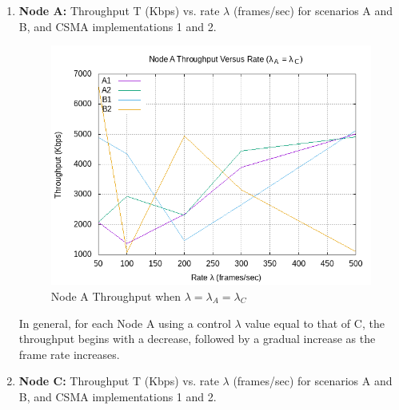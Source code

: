 \documentclass[12pt]{article}
\begin{document}
    \renewcommand{\labelenumi}{{\bf\alph{enumi})}}
    \begin{enumerate}
        \item { 
            {\bf Node A:} Throughput T (Kbps) vs. rate \(\lambda{}\) (frames/sec) for scenarios A and B, and CSMA implementations 1 and 2.
            
            \begin{figure}[!htb]
                \centering
                \includegraphics[width=5in]{1A.png}
                \caption{Node A Throughput when \(\lambda{} = \lambda{}_A = \lambda{}_C\) }
                \label{fig:1A}
            \end{figure}
            
            In general, for each Node A using a control \(\lambda{}\) value equal to that of C, the throughput begins with a decrease, followed by a gradual increase as the frame rate increases.
        }
        
\clearpage

        \item {
            {\bf Node C:} Throughput T (Kbps) vs. rate \(\lambda{}\) (frames/sec) for scenarios A and B, and CSMA implementations 1 and 2.
            
}
\end{enumerate}
\end{document}
